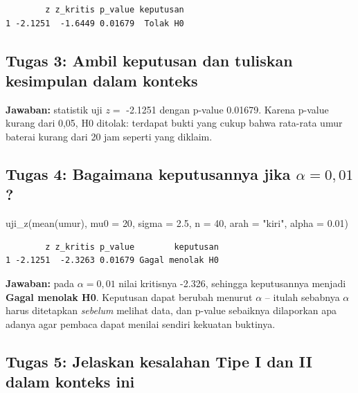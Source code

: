 \documentclass[
  indonesian,
  letterpaper,
]{book}
\newenvironment{Shaded}{\begin{snugshade}}{\end{snugshade}}
\newcommand{\AttributeTok}[1]{\textcolor[rgb]{0.40,0.45,0.13}{#1}}
\newcommand{\DecValTok}[1]{\textcolor[rgb]{0.68,0.00,0.00}{#1}}
\newcommand{\FloatTok}[1]{\textcolor[rgb]{0.68,0.00,0.00}{#1}}
\newcommand{\FunctionTok}[1]{\textcolor[rgb]{0.28,0.35,0.67}{#1}}
\newcommand{\NormalTok}[1]{\textcolor[rgb]{0.00,0.23,0.31}{#1}}
\newcommand{\StringTok}[1]{\textcolor[rgb]{0.13,0.47,0.30}{#1}}
\begin{document}
\begin{verbatim}
        z z_kritis p_value keputusan
1 -2.1251  -1.6449 0.01679  Tolak H0
\end{verbatim}

\subsection{Tugas 3: Ambil keputusan dan tuliskan kesimpulan dalam
konteks}\label{tugas-3-ambil-keputusan-dan-tuliskan-kesimpulan-dalam-konteks}

\textbf{Jawaban:} statistik uji \(z =\) -2.1251 dengan p-value 0.01679.
Karena p-value kurang dari 0,05, H0 ditolak: terdapat bukti yang cukup
bahwa rata-rata umur baterai kurang dari 20 jam seperti yang diklaim.

\subsection{\texorpdfstring{Tugas 4: Bagaimana keputusannya jika
\(\alpha = 0{,}01\)?}{Tugas 4: Bagaimana keputusannya jika \textbackslash alpha = 0\{,\}01?}}\label{tugas-4-bagaimana-keputusannya-jika-alpha-001}

\begin{Shaded}
\begin{Highlighting}[]
\FunctionTok{uji\_z}\NormalTok{(}\FunctionTok{mean}\NormalTok{(umur), }\AttributeTok{mu0 =} \DecValTok{20}\NormalTok{, }\AttributeTok{sigma =} \FloatTok{2.5}\NormalTok{, }\AttributeTok{n =} \DecValTok{40}\NormalTok{, }\AttributeTok{arah =} \StringTok{"kiri"}\NormalTok{, }\AttributeTok{alpha =} \FloatTok{0.01}\NormalTok{)}
\end{Highlighting}
\end{Shaded}

\begin{verbatim}
        z z_kritis p_value        keputusan
1 -2.1251  -2.3263 0.01679 Gagal menolak H0
\end{verbatim}

\textbf{Jawaban:} pada \(\alpha = 0{,}01\) nilai kritisnya -2.326,
sehingga keputusannya menjadi \textbf{Gagal menolak H0}. Keputusan dapat
berubah menurut \(\alpha\) -- itulah sebabnya \(\alpha\) harus
ditetapkan \emph{sebelum} melihat data, dan p-value sebaiknya dilaporkan
apa adanya agar pembaca dapat menilai sendiri kekuatan buktinya.

\subsection{Tugas 5: Jelaskan kesalahan Tipe I dan II dalam konteks
ini}\label{tugas-5-jelaskan-kesalahan-tipe-i-dan-ii-dalam-konteks-ini}
\end{document}
